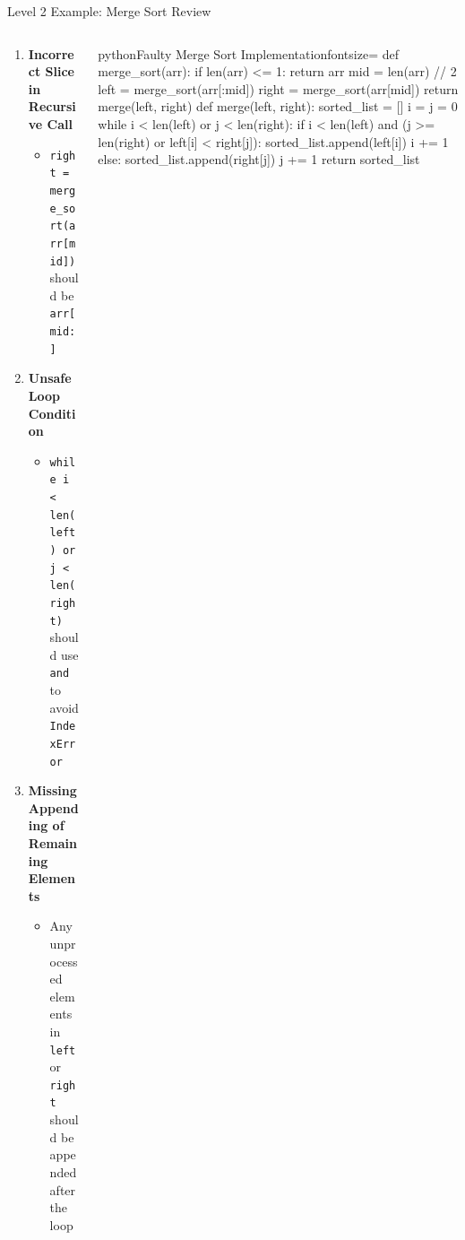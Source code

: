 \documentclass[xcolor=dvipsnames, aspectratio=169]{beamer}
\begin{document}
\begin{frame}[fragile]{Level 2 Example: Merge Sort Review}
  \begin{columns}[T]
    \begin{column}{0.42\textwidth}
      \begin{enumerate}
        \item \textbf{Incorrect Slice in Recursive Call}
          \begin{itemize}
            \item \texttt{right = merge\_sort(arr[mid])} should be \texttt{arr[mid:]}
          \end{itemize}
        
        \item \textbf{Unsafe Loop Condition}
          \begin{itemize}
            \item \texttt{while i < len(left) or j < len(right)} should use \texttt{and} to avoid \texttt{IndexError}
          \end{itemize}
        \item \textbf{Missing Appending of Remaining Elements}
          \begin{itemize}
            \item Any unprocessed elements in \texttt{left} or \texttt{right} should be appended after the loop
          \end{itemize}
      \end{enumerate}
    \end{column}
    
    \begin{column}{0.52\textwidth}
      \vspace{-1.5em}
      \begin{codeboxtc}{python}{Faulty Merge Sort Implementation}{}{fontsize=\scriptsize}
    def merge_sort(arr):
        if len(arr) <= 1:
            return arr
        mid = len(arr) // 2
        left = merge_sort(arr[:mid])
        right = merge_sort(arr[mid]) 
        return merge(left, right)
    def merge(left, right):
        sorted_list = []
        i = j = 0
        while i < len(left) or j < len(right):          
            if i < len(left) and (j >= len(right) or left[i] < right[j]):
                sorted_list.append(left[i])
                i += 1
            else:
                sorted_list.append(right[j])
                j += 1
        return sorted_list\end{codeboxtc}
    \end{column}
  \end{columns}
\end{frame}
\end{document}
